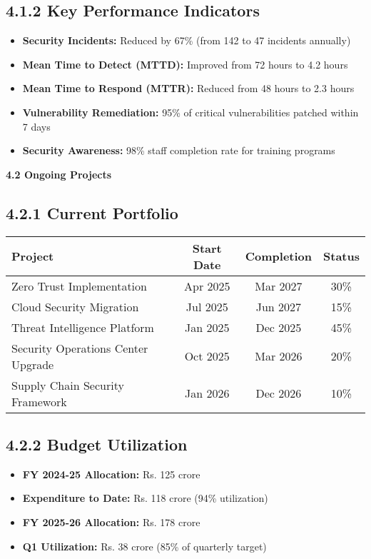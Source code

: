 \documentclass[12pt,a4paper]{report}
\newcommand{\sectionheader}[1]{\textbf{\color{govblue}#1}}
\begin{document}
\subsection*{4.1.2 Key Performance Indicators}
\begin{itemize}[leftmargin=*, itemsep=3pt]
    \item \textbf{Security Incidents:} Reduced by 67\% (from 142 to 47 incidents annually)
    \item \textbf{Mean Time to Detect (MTTD):} Improved from 72 hours to 4.2 hours
    \item \textbf{Mean Time to Respond (MTTR):} Reduced from 48 hours to 2.3 hours
    \item \textbf{Vulnerability Remediation:} 95\% of critical vulnerabilities patched within 7 days
    \item \textbf{Security Awareness:} 98\% staff completion rate for training programs
\end{itemize}

\sectionheader{4.2 Ongoing Projects}

\subsection*{4.2.1 Current Portfolio}
\begin{table}[h]
\centering
\begin{tabular}{@{}lccc@{}}
\toprule
\textbf{Project} & \textbf{Start Date} & \textbf{Completion} & \textbf{Status} \\
\midrule
Zero Trust Implementation & Apr 2025 & Mar 2027 & 30\% \\
Cloud Security Migration & Jul 2025 & Jun 2027 & 15\% \\
Threat Intelligence Platform & Jan 2025 & Dec 2025 & 45\% \\
Security Operations Center Upgrade & Oct 2025 & Mar 2026 & 20\% \\
Supply Chain Security Framework & Jan 2026 & Dec 2026 & 10\% \\
\bottomrule
\end{tabular}
\end{table}

\subsection*{4.2.2 Budget Utilization}
\begin{itemize}[leftmargin=*, itemsep=3pt]
    \item \textbf{FY 2024-25 Allocation:} Rs. 125 crore
    \item \textbf{Expenditure to Date:} Rs. 118 crore (94\% utilization)
    \item \textbf{FY 2025-26 Allocation:} Rs. 178 crore
    \item \textbf{Q1 Utilization:} Rs. 38 crore (85\% of quarterly target)
\end{itemize}
\end{document}
